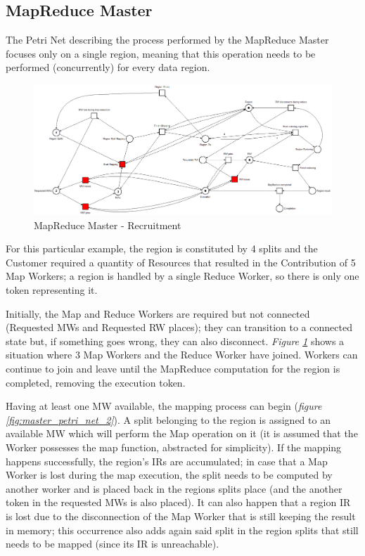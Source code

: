 \subsection{MapReduce Master}
The Petri Net describing the process performed by the MapReduce Master focuses only on a single region, meaning that this operation needs to be performed (concurrently) for every data region. 
\begin{figure}[!ht]
    \centering
    \includegraphics[width=\linewidth]{document/chapters/chapter_6/images/master_petri_net_1.png}
    \caption{MapReduce Master - Recruitment}
    \label{fig:master_petri_net_1}
\end{figure}

For this particular example, the region is constituted by 4 splits and the Customer required a quantity of Resources that resulted in the Contribution of 5 Map Workers; a region is handled by a single Reduce Worker, so there is only one token representing it.

Initially, the Map and Reduce Workers are required but not connected (Requested MWs and Requested RW places); they can transition to a connected state but, if something goes wrong, they can also disconnect. \textit{Figure \ref{fig:master_petri_net_1}} shows a situation where 3 Map Workers and the Reduce Worker have joined. Workers can continue to join and leave until the MapReduce computation for the region is completed, removing the execution token.

Having at least one MW available, the mapping process can begin (\textit{figure \ref{fig:master_petri_net_2}}). A split belonging to the region is assigned to an available MW which will perform the Map operation on it (it is assumed that the Worker possesses the map function, abstracted for simplicity). If the mapping happens successfully, the region's IRs are accumulated; in case that a Map Worker is lost during the map execution, the split needs to be computed by another worker and is placed back in the regions splits place (and the another token in the requested MWs is also placed).
It can also happen that a region IR is lost due to the disconnection of the Map Worker that is still keeping the result in memory; this occurrence also adds again said split in the region splits that still needs to be mapped (since its IR is unreachable).

